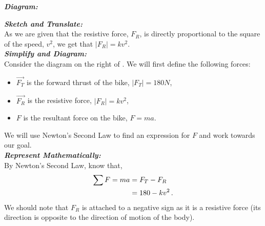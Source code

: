 %
%
%


\begin{subquestions}
	
\subquestion

\textbf{\textit{Diagram:}} \\


\subquestion

\textbf{\textit{Sketch and Translate:}} \\
As we are given that the resistive force, $F_R$, is directly proportional to the square of the speed, $v^2$, we get that $|F_R|=kv^2$. \\




\textbf{\textit{Simplify and Diagram:}} \\
Consider the diagram on the right of . We will first define the following forces:
\begin{itemize}
	\item $\vec{F_T}$ is the forward thrust of the bike, $|F_T|=180N$,
	\item $\vec{F_R}$ is the resistive force, $|F_R|=kv^2$,
	\item $F$ is the resultant force on the bike, $F=ma$.
\end{itemize}
We will use Newton's Second Law to find an expression for $F$ and work towards our goal.\\




\textbf{\textit{Represent Mathematically:}} \\
By Newton's Second Law, know that,
\begin{align}
	\sum F = ma & = F_T - F_R \nonumber \\
           & = 180-kv^2 \,.	\label{2006:q6:FEqn1} 
\end{align}
We should note that $F_R$ is attached to a negative sign as it is a resistive force (its direction is opposite to the direction of motion of the body).


\end{subquestions}
